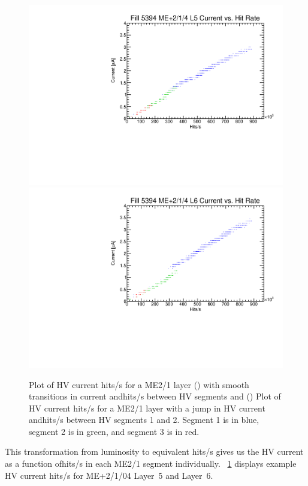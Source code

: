 \begin{figure}
	\centering
	\includegraphics[width=\twoThirdsFigWidth]{figures/neutron/ME21_P_04_5_f5394_curr_hitrate.pdf}
	\includegraphics[width=\twoThirdsFigWidth]{figures/neutron/ME21_P_04_6_f5394_curr_hitrate.pdf}
	\caption{Plot of HV current \vs\unit{hits/s} for a ME2/1 layer () with smooth transitions in current and\unit{hits/s} between HV segments and () Plot of HV current \vs\unit{hits/s} for a ME2/1 layer with a jump in HV current and\unit{hits/s} between HV segments 1 and 2. Segment 1 is in blue, segment 2 is in green, and segment 3 is in red.}
	\label{fig:ME21_IvsH}
\end{figure}

This transformation from luminosity to equivalent \unit{hits/s} gives us the HV current as a function of\unit{hits/s} in each ME2/1 segment individually. \Fig~\ref{fig:ME21_IvsH} displays example HV current \vs \unit{hits/s} for ME+2/1/04 Layer~5 and Layer~6. 

